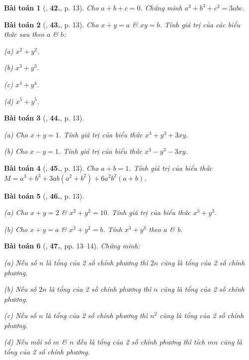 \documentclass{article}
\numberwithin{equation}{section}
\newtheorem{baitoan}{Bài toán}[section]
\begin{document}
\begin{baitoan}[\cite{Binh_Toan_8_tap_1}, \textbf{42.}, p. 13]
	Cho $a + b + c = 0$. Chứng minh $a^3 + b^3 + c^3 = 3abc$.
\end{baitoan}

\begin{baitoan}[\cite{Binh_Toan_8_tap_1}, \textbf{43.}, p. 13]
	Cho $x + y = a$ \& $xy = b$. Tính giá trị của các biểu thức sau theo $a$ \& $b$:
	\begin{enumerate*}
		\item[(a)] $x^2 + y^2$.
		\item[(b)] $x^3 + y^3$.
		\item[(c)] $x^4 + y^4$.
		\item[(d)] $x^5 + y^5$.
	\end{enumerate*}
\end{baitoan}

\begin{baitoan}[\cite{Binh_Toan_8_tap_1}, \textbf{44.}, p. 13]
	\begin{enumerate*}
		\item[(a)] Cho $x + y = 1$. Tính giá trị của biểu thức $x^3 + y^3 + 3xy$.
		\item[(b)] Cho $x - y = 1$. Tính giá trị của biểu thức $x^3 - y^3 - 3xy$.
	\end{enumerate*}
\end{baitoan}

\begin{baitoan}[\cite{Binh_Toan_8_tap_1}, \textbf{45.}, p. 13]
	Cho $a + b = 1$. Tính giá trị của biểu thức $M = a^3 + b^3 + 3ab(a^2 + b^2) + 6a^2b^2(a + b)$.
\end{baitoan}

\begin{baitoan}[\cite{Binh_Toan_8_tap_1}, \textbf{46.}, p. 13]
	\begin{enumerate*}
		\item[(a)] Cho $x + y = 2$ \& $x^2 + y^2 = 10$. Tính giá trị của biểu thức $x^3 + y^3$.
		\item[(b)] Cho $x + y = a$ \& $x^2 + y^2 = b$. Tính $x^3 + y^3$ theo $a$ \& $b$.
	\end{enumerate*}
\end{baitoan}

\begin{baitoan}[\cite{Binh_Toan_8_tap_1}, \textbf{47.}, pp. 13--14]
	Chứng minh:
	\begin{enumerate*}
		\item[(a)] Nếu số $n$ là tổng của 2 số chính phương thì $2n$ cũng là tổng của 2 số chính phương.
		\item[(b)] Nếu số $2n$ là tổng của 2 số chính phương thì $n$ cũng là tổng của 2 số chính phương.
		\item[(c)] Nếu số $n$ là tổng của 2 số chính phương thì $n^2$ cũng là tổng của 2 số chính phương.
		\item[(d)] Nếu mỗi số $m$ \& $n$ đều là tổng của 2 số chính phương thì tích $mn$ cũng là tổng của 2 số chính phương.
	\end{enumerate*}
\end{baitoan}
\end{document}
